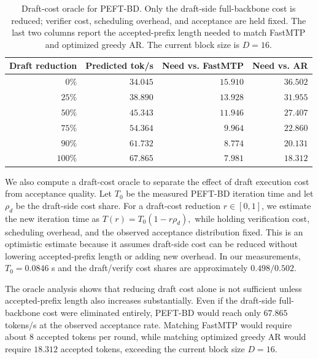 \documentclass[11pt]{article}
\begin{document}
\begin{table}[h!]
\centering
\normalsize
\begin{tabular}{rrrr}
\toprule
Draft reduction & Predicted tok/s & Need vs. FastMTP & Need vs. AR \\
\midrule
$0\%$ & $34.045$ & $15.910$ & $36.502$ \\
$25\%$ & $38.890$ & $13.928$ & $31.955$ \\
$50\%$ & $45.343$ & $11.946$ & $27.407$ \\
$75\%$ & $54.364$ & $9.964$ & $22.860$ \\
$90\%$ & $61.732$ & $8.774$ & $20.131$ \\
$100\%$ & $67.865$ & $7.981$ & $18.312$ \\
\bottomrule
\end{tabular}
\caption{Draft-cost oracle for PEFT-BD. Only the draft-side full-backbone cost is reduced; verifier cost, scheduling overhead, and acceptance are held fixed. The last two columns report the accepted-prefix length needed to match FastMTP and optimized greedy AR. The current block size is $D=16$.}
\label{tab:draft-cost-oracle}
\end{table}

We also compute a draft-cost oracle to separate the effect of draft execution cost from acceptance quality. Let $T_0$ be the measured PEFT-BD iteration time and let $\rho_d$ be the draft-side cost share. For a draft-cost reduction $r \in [0,1]$, we estimate the new iteration time as
$
T(r) = T_0(1 - r\rho_d),
$
while holding verification cost, scheduling overhead, and the observed acceptance distribution fixed. This is an optimistic estimate because it assumes draft-side cost can be reduced without lowering accepted-prefix length or adding new overhead. In our measurements, $T_0 = 0.0846$ s and the draft/verify cost shares are approximately $0.498/0.502$.



The oracle analysis shows that reducing draft cost alone is not sufficient unless accepted-prefix length also increases substantially. Even if the draft-side full-backbone cost were eliminated entirely, PEFT-BD would reach only $67.865$ tokens/s at the observed acceptance rate. Matching FastMTP would require about $8$ accepted tokens per round, while matching optimized greedy AR would require $18.312$ accepted tokens, exceeding the current block size $D=16$.
\end{document}
